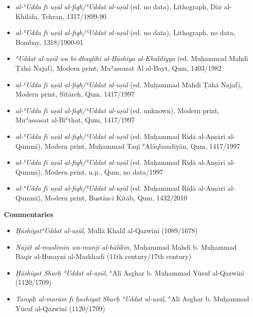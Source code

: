 \documentclass{article}
\begin{document}
\begin{enumerate}
\begin{itemize}
        \item \emph{al-ʿUdda fī uṣūl al-fiqh/ʿUddat al-uṣūl} (ed. no data), Lithograph, Dār al-Khilāfa, Tehran, 1317/1899-90
        
        \item \emph{al-ʿUdda fī uṣūl al-fiqh/ʿUddat al-uṣūl} (ed. no data), Lithograph, no data, Bombay, 1318/1900-01
        
        \item \emph{ʿUddat al-uṣūl wa bi-dhaylihi al-Ḥāshiya al-Khalīliyya} (ed. Muḥammad Mahdī Ṭāhā Najaf), Modern print, Muʾassasat Āl al-Bayt, Qum, 1403/1982
        
        \item \emph{al-ʿUdda fī uṣūl al-fiqh/ʿUddat al-uṣūl} (ed. Muḥammad Mahdī Ṭāhā Najaf), Modern print, Sītāreh, Qum, 1417/1997
        
        \item \emph{al-ʿUdda fī uṣūl al-fiqh/ʿUddat al-uṣūl} (ed. unknown), Modern print, Muʾassasat al-Biʿthat, Qum, 1417/1997
        
        \item \emph{al-ʿUdda fī uṣūl al-fiqh/ʿUddat al-uṣūl} (ed. Muḥammad Riḍā al-Anṣārī al-Qummī), Modern print, Muḥammad Taqī ʿAlāqbandiyān, Qum, 1417/1997
        
        \item \emph{al-ʿUdda fī uṣūl al-fiqh/ʿUddat al-uṣūl} (ed. Muḥammad Riḍā al-Anṣārī al-Qummī), Modern print, n.p., Qum, no data/1997
        
        \item \emph{al-ʿUdda fī uṣūl al-fiqh/ʿUddat al-uṣūl} (ed. Muḥammad Riḍā al-Anṣārī al-Qummī), Modern print, Bustān-i Kitāb, Qum, 1432/2010
        \end{itemize}
\textbf{Commentaries}
\begin{itemize}
              \item \emph{ḤāshiyatʿUddat al-uṣūl}, Mullā Khalīl al-Qazwīnī (1089/1678)
            
              \item \emph{Najāt al-muslimīn wa-munjī al-hālikīn}, Muḥammad Mahdī b. Muḥammad Bāqir al-Ḥusaynī al-Mashhadī (11th century/17th century)
            
              \item \emph{Ḥāshiyat Sharḥ ʿUddat al-uṣūl}, ʿAlī Asghar b. Muḥammad Yūsuf al-Qazwīnī (1120/1709)
            
              \item \emph{Tanqīḥ al-marām fī ḥashiyat Sharḥ ʿUddat al-uṣūl}, ʿAlī Asghar b. Muḥammad Yūsuf al-Qazwīnī (1120/1709)
            

\end{itemize}
\end{enumerate}
\end{document}
